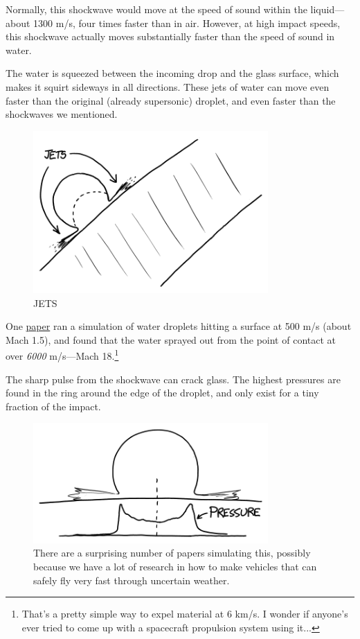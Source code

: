 {{Normally, this shockwave would move at the speed of sound within the liquid—about 1300 m/s, four times faster than in air. However, at high impact speeds, this shockwave actually moves substantially faster than the speed of sound in water.}

{The water is squeezed between the incoming drop and the glass surface, which makes it squirt sideways in all directions. These jets of water can move even faster than the original (already supersonic) droplet, and even faster than the shockwaves we mentioned.}

\begin{figure}[!htbp]
\centering
\includegraphics[scale=0.5, max width=0.8\textwidth]{imgs/a/93/rain_jets.png}
\caption{JETS}
\end{figure}

{One \href{http://e-collection.library.ethz.ch/eserv/eth:26251/eth-26251-02.pdf}{paper} ran a simulation of water droplets hitting a surface at 500 m/s (about Mach 1.5), and found that the water sprayed out from the point of contact at over \emph{6000} m/s—Mach 18.{\footnote{That's a pretty simple way to expel material at 6 km/s. I wonder if anyone's ever tried to come up with a spacecraft propulsion system using it...} } }

{The sharp pulse from the shockwave can crack glass. The highest pressures are found in the ring around the edge of the droplet, and only exist for a tiny fraction of the impact.}

\begin{figure}[!htbp]
\centering
\includegraphics[scale=0.5, max width=0.8\textwidth]{imgs/a/93/rain_impact.png}
\caption{There are a surprising number of papers simulating this, possibly because we have a lot of research in how to make vehicles that can safely fly very fast through uncertain weather.}
\end{figure}

}
